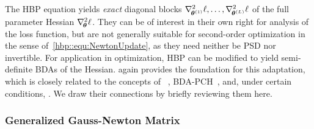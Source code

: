 The HBP equation yields \emph{exact} diagonal blocks
$\nabla_{\!{{\bm{\theta}}^{(1)}}}^{2}\ell, \dots, \nabla_{\!{{\bm{\theta}}^{(L)}}}^{2}\ell$ of the
full parameter Hessian $\nabla_{\!{{\bm{\theta}}}}^{2}\ell$. They can be of interest in
their own right for analysis of the loss function, but are not generally
suitable for second-order optimization in the sense
of~\eqref{hbp::equ:NewtonUpdate}, as they need neither be PSD nor invertible.
For application in optimization, HBP can be modified to yield semi-definite BDAs
of the Hessian.  again provides the
foundation for this adaptation, which is closely related to the concepts of
\KFRA~\citep{botev2017practical}, BDA-PCH~\citep{wei2018bdapch}, and, under
certain conditions, \KFAC \citep{martens2015optimizing}. We draw their
connections by briefly reviewing them here.

\subsubsection{Generalized Gauss-Newton Matrix}

